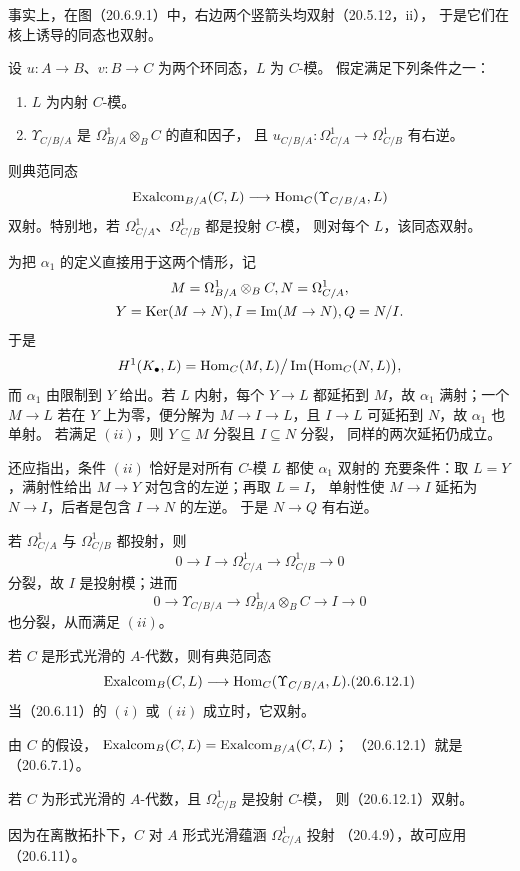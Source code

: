 事实上，在图（20.6.9.1）中，右边两个竖箭头均双射（20.5.12，ii），
于是它们在核上诱导的同态也双射。

设 $u:A\to B$、$v:B\to C$ 为两个环同态，$L$ 为 $C$-模。
假定满足下列条件之一：
\begin{enumerate}[label=(\roman*)]
\item $L$ 为内射 $C$-模。
\item $\Upsilon_{C/B/A}$ 是 $\Omega^1_{B/A}\otimes_B C$ 的直和因子，
且 $u_{C/B/A}:\Omega^1_{C/A}\to\Omega^1_{C/B}$ 有右逆。
\end{enumerate}
则典范同态
\[
 \operatorname{Exalcom}_{B/A}(C,L)\longrightarrow\operatorname{Hom}_C(\Upsilon_{C/B/A},L)
\]
双射。特别地，若 $\Omega^1_{C/A}$、$\Omega^1_{C/B}$ 都是投射 $C$-模，
则对每个 $L$，该同态双射。

为把 $\alpha_1$ 的定义直接用于这两个情形，记
\[
\begin{gathered}
 M=\Omega^1_{B/A}\otimes_B C, N=\Omega^1_{C/A},\\
 Y=\operatorname{Ker}(M\to N), I=\operatorname{Im}(M\to N), Q=N/I .
\end{gathered}
\]
于是
\[
 H^1(K_\bullet,L)
 =\operatorname{Hom}_C(M,L)\big/\operatorname{Im}\bigl(\operatorname{Hom}_C(N,L)\bigr),
\]
而 $\alpha_1$ 由限制到 $Y$ 给出。若 $L$ 内射，每个 $Y\to L$ 都延拓到
$M$，故 $\alpha_1$ 满射；一个 $M\to L$ 若在 $Y$ 上为零，便分解为
$M\to I\to L$，且 $I\to L$ 可延拓到 $N$，故 $\alpha_1$ 也单射。
若满足 $(ii)$，则 $Y\subseteq M$ 分裂且 $I\subseteq N$ 分裂，
同样的两次延拓仍成立。

还应指出，条件 $(ii)$ 恰好是对所有 $C$-模 $L$ 都使 $\alpha_1$ 双射的
充要条件：取 $L=Y$，满射性给出 $M\to Y$ 对包含的左逆；再取 $L=I$，
单射性使 $M\to I$ 延拓为 $N\to I$，后者是包含 $I\to N$ 的左逆。
于是 $N\to Q$ 有右逆。

若 $\Omega^1_{C/A}$ 与 $\Omega^1_{C/B}$ 都投射，则
\[
 0\longrightarrow I\longrightarrow\Omega^1_{C/A}
 \longrightarrow\Omega^1_{C/B}\longrightarrow0
\]
分裂，故 $I$ 是投射模；进而
\[
 0\longrightarrow\Upsilon_{C/B/A}\longrightarrow
 \Omega^1_{B/A}\otimes_B C\longrightarrow I\longrightarrow0
\]
也分裂，从而满足 $(ii)$。

若 $C$ 是形式光滑的 $A$-代数，则有典范同态
\begin{equation}
 \Exalcom_B(C,L)\longrightarrow\Hom_C(\Upsilon_{C/B/A},L).
 \tag{20.6.12.1}
\end{equation}
当（20.6.11）的 $(i)$ 或 $(ii)$ 成立时，它双射。

由 $C$ 的假设，
$\operatorname{Exalcom}_B(C,L)=\operatorname{Exalcom}_{B/A}(C,L)$；
（20.6.12.1）就是（20.6.7.1）。

若 $C$ 为形式光滑的 $A$-代数，且 $\Omega^1_{C/B}$ 是投射 $C$-模，
则（20.6.12.1）双射。

因为在离散拓扑下，$C$ 对 $A$ 形式光滑蕴涵 $\Omega^1_{C/A}$ 投射
（20.4.9），故可应用（20.6.11）。
